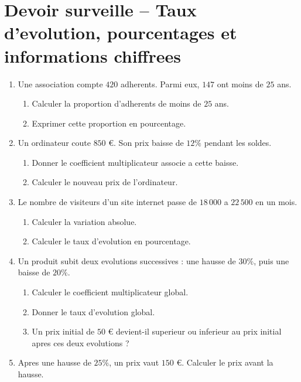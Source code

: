 \documentclass[french,11pt]{book}
\newcommand{\pourcent}{\%}
\begin{document}
\chapter*{Devoir surveille -- Taux d'evolution, pourcentages et informations chiffrees}

\begin{enumerate}
\item Une association compte $420$ adherents. Parmi eux, $147$ ont moins de $25$ ans.
\begin{enumerate}
\item Calculer la proportion d'adherents de moins de $25$ ans.
\item Exprimer cette proportion en pourcentage.
\end{enumerate}

\item Un ordinateur coute $850$ \euro{}. Son prix baisse de $12\pourcent$ pendant les soldes.
\begin{enumerate}
\item Donner le coefficient multiplicateur associe a cette baisse.
\item Calculer le nouveau prix de l'ordinateur.
\end{enumerate}

\item Le nombre de visiteurs d'un site internet passe de $18\,000$ a $22\,500$ en un mois.
\begin{enumerate}
\item Calculer la variation absolue.
\item Calculer le taux d'evolution en pourcentage.
\end{enumerate}

\item Un produit subit deux evolutions successives : une hausse de $30\pourcent$, puis une baisse de $20\pourcent$.
\begin{enumerate}
\item Calculer le coefficient multiplicateur global.
\item Donner le taux d'evolution global.
\item Un prix initial de $50$ \euro{} devient-il superieur ou inferieur au prix initial apres ces deux evolutions ?
\end{enumerate}

\item Apres une hausse de $25\pourcent$, un prix vaut $150$ \euro{}. Calculer le prix avant la hausse.
\end{enumerate}
\end{document}
